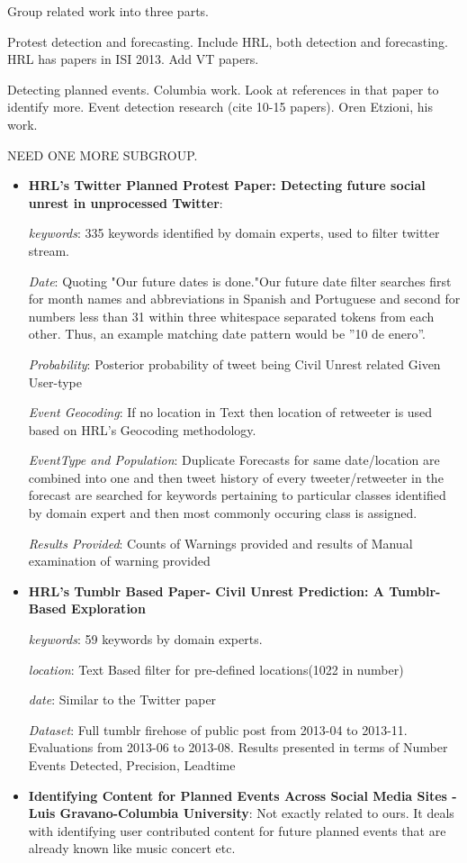 Group related work into three parts.

Protest detection and forecasting. Include HRL, both detection and 
forecasting. HRL has papers in ISI 2013. Add VT papers.

Detecting planned events. Columbia work. Look at references in that
paper to identify more. Event detection research (cite 10-15 papers).
Oren Etzioni, his work.

NEED ONE MORE SUBGROUP.


\begin{itemize}
    \item
        \textbf{HRL's Twitter Planned Protest Paper: Detecting future social unrest in unprocessed Twitter}: 

        {\em keywords}: 335 keywords identified by domain experts, used to filter twitter stream.

        {\em Date}: Quoting "Our future dates is done."Our future date filter searches first for month names and abbreviations in Spanish and Portuguese and second for numbers less than 31 within three whitespace separated tokens from each other. Thus, an example matching date pattern would be ”10 de enero”.


        {\em Probability}: Posterior probability of tweet being Civil Unrest related Given User-type

        {\em Event Geocoding}: If no location in Text then location of retweeter is used based on HRL's Geocoding methodology.

        {\em EventType and Population}: Duplicate Forecasts for same date/location are combined into one and then tweet history of every tweeter/retweeter in the forecast are searched for keywords pertaining to particular classes identified by domain expert and then most commonly occuring class is assigned.
        
        {\em Results Provided}: Counts of Warnings provided and results of Manual examination of warning provided

    \item \textbf{HRL's Tumblr Based Paper- Civil Unrest Prediction: A Tumblr-Based Exploration}

        {\em keywords}: 59 keywords by domain experts.

        {\em location}: Text Based filter for pre-defined locations(1022 in number)

        {\em date}: Similar to the Twitter paper

        {\em Dataset}: Full tumblr firehose of public post from 2013-04 to 2013-11. Evaluations from 2013-06 to 2013-08. Results presented in terms of Number Events Detected, Precision, Leadtime

    \item \textbf{Identifying Content for Planned Events Across Social Media Sites - Luis Gravano-Columbia University}:
            Not exactly related to ours. It deals with identifying user contributed content for future planned events that are already known like music concert etc.

\end{itemize}
